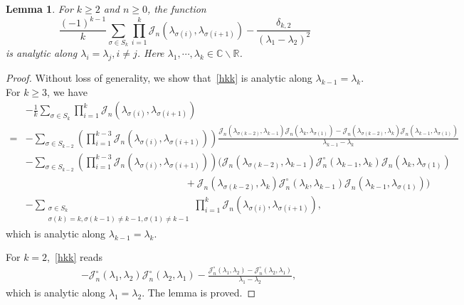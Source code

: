 \documentclass[a4paper]{article}
\theoremstyle{plain}
\newtheorem{lem}{Lemma}
\theoremstyle{definition}
\newcommand{\RR}{\mathbb{R}}
\newcommand{\CC}{\mathbb{C}}
\newcommand{\nn}{\nonumber}
\begin{document}
	\begin{lem} \label{analytic}
		For $k\ge2$ and $n\ge0$, the function
		\begin{equation} \label{hkk}
			\frac{(-1)^{k-1}}{k}\sum_{\sigma\in S_k}\prod_{i=1}^k\mathcal J_n(\lambda_{\sigma(i)},\lambda_{\sigma(i+1)})-\frac{\delta_{k,2}}{(\lambda_1-\lambda_2)^2}
		\end{equation}
		is analytic along $\lambda_i=\lambda_j,i\neq j$. Here $\lambda_1,\cdots,\lambda_k\in\CC\backslash\RR$.
	\end{lem}
	\begin{proof}
	Without loss of generality, we show that~\eqref{hkk} is analytic along $\lambda_{k-1}=\lambda_k$. For $k\ge3$, we have
	\begin{align}
		&-\frac{1}{k}\sum_{\sigma\in S_k}\prod_{i=1}^k\mathcal J_n(\lambda_{\sigma(i)},\lambda_{\sigma(i+1)})\nn\\
		=&-\sum_{\sigma\in S_{k-2}}\left(\prod_{i=1}^{k-3}\mathcal J_n(\lambda_{\sigma(i)},\lambda_{\sigma(i+1)})\right)\frac{\mathcal J_n(\lambda_{\sigma(k-2)},\lambda_{k-1})\mathcal J_n(\lambda_k,\lambda_{\sigma(1)})-\mathcal J_n(\lambda_{\sigma(k-2)},\lambda_k)\mathcal J_n(\lambda_{k-1},\lambda_{\sigma(1)})}{\lambda_{k-1}-\lambda_k}\nn\\
		&-\sum_{\sigma\in S_{k-2}}\left(\prod_{i=1}^{k-3}\mathcal J_n(\lambda_{\sigma(i)},\lambda_{\sigma(i+1)})\right)\bigg(\mathcal J_n(\lambda_{\sigma(k-2)},\lambda_{k-1})\mathcal J_n^\circ(\lambda_{k-1},\lambda_k)\mathcal J_n(\lambda_k,\lambda_{\sigma(1)})\nn\\
		&\qquad\qquad\qquad\qquad\qquad\qquad\qquad\qquad+\mathcal J_n(\lambda_{\sigma(k-2)},\lambda_k)\mathcal J_n^\circ(\lambda_k,\lambda_{k-1})\mathcal J_n(\lambda_{k-1},\lambda_{\sigma(1)})\bigg)\nn\\
		&-\sum_{\substack{\sigma\in S_k\\\sigma(k)=k,\sigma(k-1)\neq k-1,\sigma(1)\neq k-1}}\prod_{i=1}^k\mathcal J_n(\lambda_{\sigma(i)},\lambda_{\sigma(i+1)}),
	\end{align}
	which is analytic along $\lambda_{k-1}=\lambda_k$.

	For $k=2$,~\eqref{hkk} reads
	\begin{align}
		&-\mathcal J_n^\circ(\lambda_1,\lambda_2)\mathcal J_n^\circ(\lambda_2,\lambda_1)-\frac{\mathcal J_n^\circ(\lambda_1,\lambda_2)-\mathcal J_n^\circ(\lambda_2,\lambda_1)}{\lambda_1-\lambda_2},
	\end{align}
	which is analytic along $\lambda_1=\lambda_2$. The lemma is proved.
	\end{proof}
\end{document}
